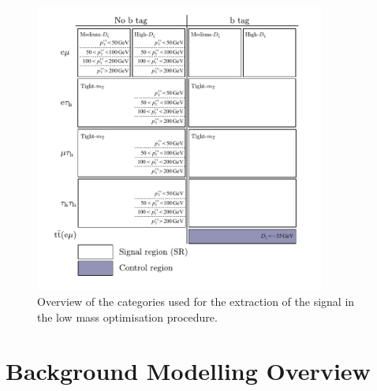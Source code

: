 \begin{figure}[!hbtp]
\centering
    \includegraphics[width=0.85\textwidth]{Figures/low_mass_categories.pdf}
\caption{Overview of the categories used for the extraction of the signal in the low mass optimisation procedure.}
\label{fig:low_mass_categories}
\end{figure}

\section{Background Modelling Overview}
\label{sec:background_modelling}


